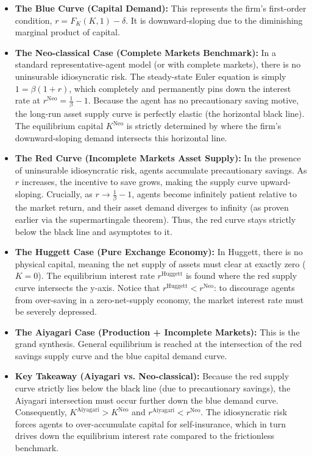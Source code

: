 \begin{itemize}
    \item \textbf{The Blue Curve (Capital Demand):} This represents the firm's first-order condition, $r = F_K(K,1) - \delta$. It is downward-sloping due to the diminishing marginal product of capital. 
    \item \textbf{The Neo-classical Case (Complete Markets Benchmark):} In a standard representative-agent model (or with complete markets), there is no uninsurable idiosyncratic risk. The steady-state Euler equation is simply $1 = \beta (1+r)$, which completely and permanently pins down the interest rate at $r^{\text{Neo}} = \frac{1}{\beta} - 1$. Because the agent has no precautionary saving motive, the long-run asset supply curve is perfectly elastic (the horizontal black line). The equilibrium capital $K^{\text{Neo}}$ is strictly determined by where the firm's downward-sloping demand intersects this horizontal line.
    \item \textbf{The Red Curve (Incomplete Markets Asset Supply):} In the presence of uninsurable idiosyncratic risk, agents accumulate precautionary savings. As $r$ increases, the incentive to save grows, making the supply curve upward-sloping. Crucially, as $r \to \frac{1}{\beta} - 1$, agents become infinitely patient relative to the market return, and their asset demand diverges to infinity (as proven earlier via the supermartingale theorem). Thus, the red curve stays strictly below the black line and asymptotes to it.
    \item \textbf{The Huggett Case (Pure Exchange Economy):} In Huggett, there is no physical capital, meaning the net supply of assets must clear at exactly zero ($K=0$). The equilibrium interest rate $r^{\text{Huggett}}$ is found where the red supply curve intersects the y-axis. Notice that $r^{\text{Huggett}} < r^{\text{Neo}}$: to discourage agents from over-saving in a zero-net-supply economy, the market interest rate must be severely depressed.
    \item \textbf{The Aiyagari Case (Production + Incomplete Markets):} This is the grand synthesis. General equilibrium is reached at the intersection of the red savings supply curve and the blue capital demand curve. 
    \item \textbf{Key Takeaway (Aiyagari vs. Neo-classical):} Because the red supply curve strictly lies below the black line (due to precautionary savings), the Aiyagari intersection must occur further down the blue demand curve. Consequently, $K^{\text{Aiyagari}} > K^{\text{Neo}}$ and $r^{\text{Aiyagari}} < r^{\text{Neo}}$. The idiosyncratic risk forces agents to over-accumulate capital for self-insurance, which in turn drives down the equilibrium interest rate compared to the frictionless benchmark.
\end{itemize}
    
